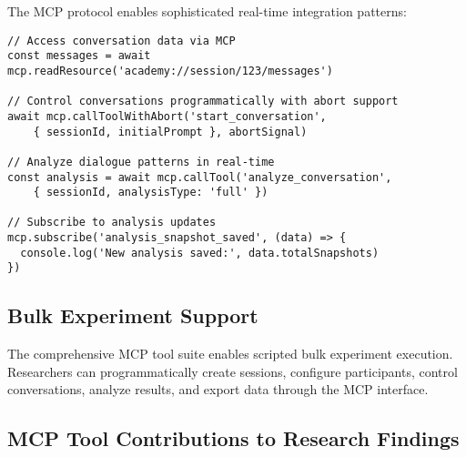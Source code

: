 \documentclass[11pt,letterpaper]{article}
\begin{document}
The MCP protocol enables sophisticated real-time integration patterns:

\begin{verbatim}
// Access conversation data via MCP
const messages = await mcp.readResource('academy://session/123/messages')

// Control conversations programmatically with abort support
await mcp.callToolWithAbort('start_conversation', 
    { sessionId, initialPrompt }, abortSignal)

// Analyze dialogue patterns in real-time
const analysis = await mcp.callTool('analyze_conversation', 
    { sessionId, analysisType: 'full' })

// Subscribe to analysis updates
mcp.subscribe('analysis_snapshot_saved', (data) => {
  console.log('New analysis saved:', data.totalSnapshots)
})
\end{verbatim}

\subsection{Bulk Experiment Support}

The comprehensive MCP tool suite enables scripted bulk experiment execution. Researchers can programmatically create sessions, configure participants, control conversations, analyze results, and export data through the MCP interface.

\subsection{MCP Tool Contributions to Research Findings}
\end{document}
